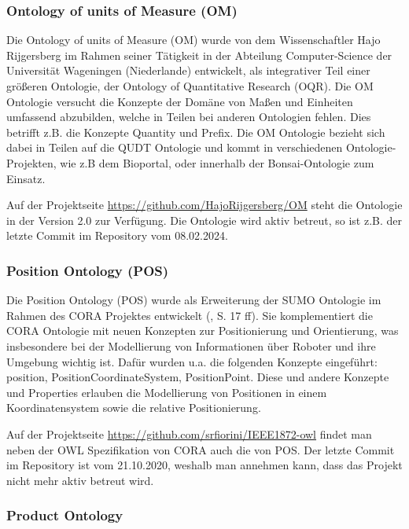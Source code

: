 \documentclass{article}
\begin{document}
\subsubsection{Ontology of units of Measure (OM)}

Die Ontology of units of Measure (OM) wurde von dem Wissenschaftler Hajo Rijgersberg im Rahmen seiner Tätigkeit in der Abteilung Computer-Science der Universität Wageningen (Niederlande) entwickelt, als integrativer Teil einer größeren Ontologie\cite{rijgersberg2013ontology}, der Ontology of Quantitative Research (OQR).
Die OM Ontologie versucht die Konzepte der Domäne von Maßen und Einheiten umfassend abzubilden, welche in Teilen bei anderen Ontologien fehlen. Dies betrifft z.B. die Konzepte Quantity und Prefix. Die OM Ontologie bezieht sich dabei in Teilen auf die QUDT Ontologie und kommt in verschiedenen Ontologie-Projekten, wie z.B dem Bioportal\cite{OM_BioPortal}, oder innerhalb der Bonsai-Ontologie \cite{ghose2022core} zum Einsatz.

Auf der Projektseite \url{https://github.com/HajoRijgersberg/OM} steht die Ontologie in der Version 2.0 zur Verfügung. Die Ontologie wird aktiv betreut, so ist z.B. der letzte Commit im Repository vom 08.02.2024.

\subsubsection{Position Ontology (POS)}


Die Position Ontology (POS) wurde als Erweiterung der SUMO Ontologie im Rahmen des CORA Projektes entwickelt (\cite{fiorini2015extensions}, S. 17 ff).
Sie komplementiert die CORA Ontologie mit neuen Konzepten zur Positionierung und Orientierung, was insbesondere bei der Modellierung von Informationen über Roboter und ihre Umgebung wichtig ist.
Dafür wurden u.a. die folgenden Konzepte eingeführt: position, PositionCoordinateSystem, PositionPoint.
Diese und andere Konzepte und Properties erlauben die Modellierung von Positionen in einem Koordinatensystem sowie die relative Positionierung.

Auf der Projektseite \url{https://github.com/srfiorini/IEEE1872-owl} findet man neben der OWL Spezifikation von CORA auch die von POS. Der letzte Commit im Repository ist vom 21.10.2020, weshalb man annehmen kann, dass das Projekt nicht mehr aktiv betreut wird.

\subsubsection{Product Ontology}
\end{document}
